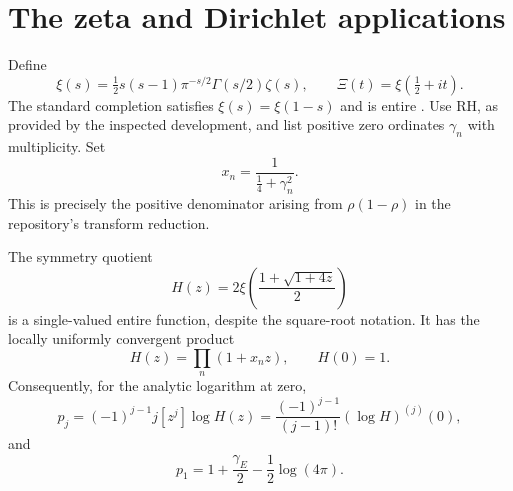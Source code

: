 \section{The zeta and Dirichlet applications}\label{sec:zeta}

Define
\[
 \xi(s)=\tfrac12s(s-1)\pi^{-s/2}\Gamma(s/2)\zeta(s),
 \qquad \Xi(t)=\xi(\tfrac12+it).
\]
The standard completion satisfies $\xi(s)=\xi(1-s)$ and is entire
\cite{dlmf,cardon}. Use RH, as provided by the inspected development, and list
positive zero ordinates $\gamma_n$ with multiplicity. Set
\begin{equation}\label{eq:zetanodes}
 x_n=\frac1{\tfrac14+\gamma_n^2}.
\end{equation}
This is precisely the positive denominator arising from
$\rho(1-\rho)$ in the repository's transform reduction.

\begin{proposition}\label{prop:xi}
The symmetry quotient
\begin{equation}\label{eq:H}
 H(z)=2\xi\!\left(\frac{1+\sqrt{1+4z}}2\right)
\end{equation}
is a single-valued entire function, despite the square-root notation. It has
the locally uniformly convergent product
\begin{equation}\label{eq:Hproduct}
 H(z)=\prod_n(1+x_nz),\qquad H(0)=1.
\end{equation}
Consequently, for the analytic logarithm at zero,
\begin{equation}\label{eq:logmoments}
 p_j=(-1)^{j-1}j[z^j]\log H(z)
     =\frac{(-1)^{j-1}}{(j-1)!}(\log H)^{(j)}(0),
\end{equation}
and
\begin{equation}\label{eq:p1}
 p_1=1+\frac{\gamma_{\!E}}2-\frac12\log(4\pi).
\end{equation}
\end{proposition}

